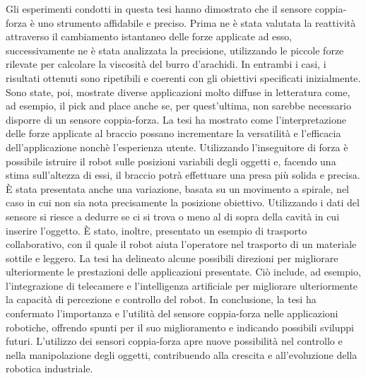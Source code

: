 Gli esperimenti condotti in questa tesi hanno dimostrato che il sensore coppia-forza \`{e} uno strumento affidabile e preciso. 
Prima ne \`{e} stata valutata la reattivit\`{a} attraverso il cambiamento istantaneo delle forze applicate ad esso, 
successivamente ne \`{e} stata analizzata la precisione, utilizzando le piccole forze rilevate per calcolare la viscosit\`{a} del 
burro d'arachidi. 
In entrambi i casi, i risultati ottenuti sono ripetibili e coerenti con gli obiettivi specificati inizialmente. 
Sono state, poi, mostrate diverse applicazioni molto diffuse in letteratura come, ad esempio, il pick and place anche se, per 
quest'ultima, non sarebbe necessario disporre di un sensore coppia-forza. La tesi ha mostrato come l'interpretazione 
delle forze applicate al braccio possano incrementare la versatilit\`{a} e l'efficacia dell'applicazione nonch\`{e} l'esperienza 
utente. Utilizzando l'inseguitore di forza \`{e} possibile istruire il robot sulle posizioni variabili degli oggetti e, 
facendo una stima sull'altezza di essi, il braccio potr\`{a} effettuare una presa pi\`{u} solida e precisa. 
\`{E} stata presentata anche una variazione, basata su un movimento a spirale, nel caso in cui non sia nota precisamente la posizione 
obiettivo. Utilizzando i dati 
del sensore si riesce a dedurre se ci si trova o meno al di sopra della cavit\`{a} in cui inserire l'oggetto. 
\`{E} stato, inoltre, presentato un esempio di trasporto collaborativo, con il quale il robot aiuta l'operatore nel trasporto 
di un materiale sottile e leggero. 
La tesi ha delineato alcune possibili direzioni per migliorare ulteriormente le prestazioni delle applicazioni presentate. 
Ci\`{o} include, ad esempio, l'integrazione di telecamere e l'intelligenza artificiale per migliorare ulteriormente la capacit\`{a} 
di percezione e controllo del robot. 
In conclusione, la tesi ha confermato l'importanza e l'utilità del sensore coppia-forza nelle applicazioni robotiche, 
offrendo spunti per il suo miglioramento e indicando possibili sviluppi futuri. L'utilizzo dei sensori coppia-forza apre 
nuove possibilità nel controllo e nella manipolazione degli oggetti, contribuendo alla crescita e all'evoluzione 
della robotica industriale.